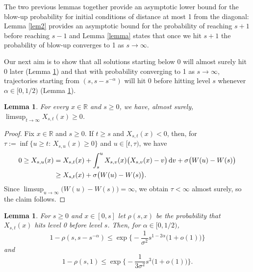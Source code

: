 \documentclass[sn-mathphys-num]{sn-jnl}
\newtheorem{lem}[thm]{Lemma}
\theoremstyle{definition}
\newcommand{\scr}[1]{\mathscr #1}
\numberwithin{equation}{section} \theoremstyle{remark}
\renewcommand{\d}{\hbox{d}}
\def\R{\mathbb R}
\def\d{\text{\rm{d}}} \def\bb{\beta} \def\aa{\alpha} \def\D{\scr D}
\newcommand{\1}{\mathbbm{1}}
\begin{document}
The two previous lemmas together provide an asymptotic lower bound for the blow-up probability for initial conditions of distance at most 1 from the diagonal:  
Lemma \ref{lem2} provides an asymptotic bound for the probability of reaching $s+1$ before reaching $s-1$ and Lemma \ref{lemma} states that once we hit $s+1$ the probability of blow-up converges to 1 as $s \to \infty$.





  

Our next aim is to show that all solutions starting below 0 will almost surely hit 0 later (Lemma \ref{einfach}) and that with probability converging to 1 as $s \to \infty$, trajectories starting from $(s,s-s^{-\alpha})$ will hit 0 before hitting level $s$ whenever $\alpha \in [0,1/2)$ (Lemma \ref{schwieriger}).

\begin{lem}\label{einfach}
For every $x \in \R$ and $s \geq 0$, we have, almost surely, $\limsup_{t \to \infty}X_{s,t}(x)\geq 0$.
\end{lem}

\begin{proof}
  Fix $x \in \R$ and $s \geq 0$. If $t \geq s$  and $X_{s,t}(x)<0$, then, for  $\tau:=\inf \{u \geq t:\, X_{s,u}(x)\geq 0\}$ and $u \in [t,\tau)$, we have
  \begin{align*}
    0 \geq X_{s,u}(x)&=X_{s,t}(x)+\int_s^uX_{s,v}(x)\big( X_{s,v}(x)-v\big)\,\d v +\sigma\big(W(u)-W(s)\big)\\
    &\geq X_{s,t}(x)   +\sigma\big(W(u)-W(s)\big).
\end{align*}
Since $\limsup_{u \to \infty} \big(W(u)-W(s)\big) =\infty$, we obtain $\tau<\infty$ almost surely, so the claim follows.
\end{proof}

\begin{lem}\label{schwieriger}
  For $s \geq 0$ and $x \in [0,s]$ let $\rho(s,x)$ be the probability that $X_{s,t}(x)$ hits level 0 before level $s$. Then, for $\alpha \in [0,1/2)$,
  \begin{equation}\label{claim1}
1-\rho(s,s-s^{-\alpha})\leq \exp\Big\{-\frac 1{\sigma^2}s^{1-2\alpha}\big(1+o(1)\big)\Big\} 
  \end{equation}
  and
  \begin{equation}\label{claim2}
1-\rho(s,1)\leq \exp\Big\{-\frac 1{3\sigma^2}s^3\big(1+o(1)\big)\Big\}. 
  \end{equation}
\end{lem}
\end{document}
